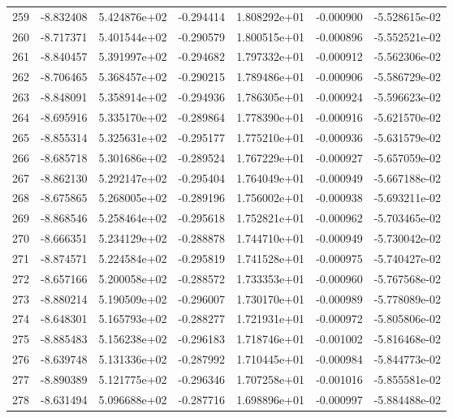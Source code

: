 \begin{tabular}{rrrrrrr}
 259 &  -8.832408 &  5.424876e+02 & -0.294414 &  1.808292e+01 &   -0.000900 & -5.528615e-02 \\
 260 &  -8.717371 &  5.401544e+02 & -0.290579 &  1.800515e+01 &   -0.000896 & -5.552521e-02 \\
 261 &  -8.840457 &  5.391997e+02 & -0.294682 &  1.797332e+01 &   -0.000912 & -5.562306e-02 \\
 262 &  -8.706465 &  5.368457e+02 & -0.290215 &  1.789486e+01 &   -0.000906 & -5.586729e-02 \\
 263 &  -8.848091 &  5.358914e+02 & -0.294936 &  1.786305e+01 &   -0.000924 & -5.596623e-02 \\
 264 &  -8.695916 &  5.335170e+02 & -0.289864 &  1.778390e+01 &   -0.000916 & -5.621570e-02 \\
 265 &  -8.855314 &  5.325631e+02 & -0.295177 &  1.775210e+01 &   -0.000936 & -5.631579e-02 \\
 266 &  -8.685718 &  5.301686e+02 & -0.289524 &  1.767229e+01 &   -0.000927 & -5.657059e-02 \\
 267 &  -8.862130 &  5.292147e+02 & -0.295404 &  1.764049e+01 &   -0.000949 & -5.667188e-02 \\
 268 &  -8.675865 &  5.268005e+02 & -0.289196 &  1.756002e+01 &   -0.000938 & -5.693211e-02 \\
 269 &  -8.868546 &  5.258464e+02 & -0.295618 &  1.752821e+01 &   -0.000962 & -5.703465e-02 \\
 270 &  -8.666351 &  5.234129e+02 & -0.288878 &  1.744710e+01 &   -0.000949 & -5.730042e-02 \\
 271 &  -8.874571 &  5.224584e+02 & -0.295819 &  1.741528e+01 &   -0.000975 & -5.740427e-02 \\
 272 &  -8.657166 &  5.200058e+02 & -0.288572 &  1.733353e+01 &   -0.000960 & -5.767568e-02 \\
 273 &  -8.880214 &  5.190509e+02 & -0.296007 &  1.730170e+01 &   -0.000989 & -5.778089e-02 \\
 274 &  -8.648301 &  5.165793e+02 & -0.288277 &  1.721931e+01 &   -0.000972 & -5.805806e-02 \\
 275 &  -8.885483 &  5.156238e+02 & -0.296183 &  1.718746e+01 &   -0.001002 & -5.816468e-02 \\
 276 &  -8.639748 &  5.131336e+02 & -0.287992 &  1.710445e+01 &   -0.000984 & -5.844773e-02 \\
 277 &  -8.890389 &  5.121775e+02 & -0.296346 &  1.707258e+01 &   -0.001016 & -5.855581e-02 \\
 278 &  -8.631494 &  5.096688e+02 & -0.287716 &  1.698896e+01 &   -0.000997 & -5.884488e-02 \\

\end{tabular}
